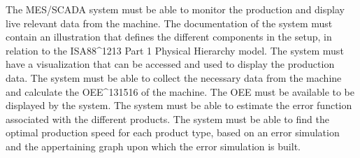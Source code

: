 The MES/SCADA system must be able to monitor the production and display live relevant data from the machine.
The documentation of the system must contain an illustration that defines the different components in the setup, in relation to the ISA88^1213 Part 1 Physical Hierarchy model. The system must have a visualization that can be accessed and used to display the production data. The system must be able to collect the necessary data from the machine and calculate the OEE^131516 of the machine. The OEE must be available to be displayed by the system. The system must be able to estimate the error function associated with the different products.
The system must be able to find the optimal production speed for each product type, based on an error simulation and the appertaining graph upon which the error simulation is built.

